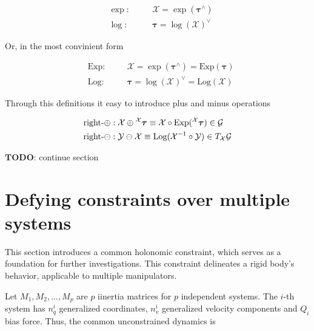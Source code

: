 \begin{equation}
    \begin{aligned}
        \label{eqn:exp_log_for_r_m}
        & \exp : \quad && \mathcal{X} = \exp(\boldsymbol{\tau}^\wedge) \\
        & \log : \quad && \boldsymbol{\tau} = \log(\mathcal{X})^\vee
    \end{aligned}
\end{equation}

Or, in the most convinient form

\begin{equation}
    \begin{aligned}
        \label{eqn:big_exp_log_for_r_m}
        & \text{Exp} : \quad && \mathcal{X} 
        = \exp(\boldsymbol{\tau}^\wedge) 
        = \text{Exp}(\boldsymbol{\tau})\\
        & \text{Log} : \quad && \boldsymbol{\tau} 
        = \log(\mathcal{X})^\vee
        = \text{Log}(\mathcal{X})
    \end{aligned}
\end{equation}

Through this definitions it easy to introduce plus and minus operations

\begin{equation}
    \begin{aligned}
        & \text{right-} \oplus: 
        \mathcal{X} \oplus \prescript{\mathcal{X}}{}{\boldsymbol{\tau}} 
        \equiv \mathcal{X} \circ 
        \text{Exp}(\prescript{\mathcal{X}}{}{\boldsymbol{\tau}}) \in \mathcal{G} \\
        & \text{right-} \ominus:
        \mathcal{Y} \ominus \mathcal{X} 
        \equiv \text{Log}(\mathcal{X}^{-1} \circ \mathcal{Y}) 
        \in T_{\mathcal{X}}\mathcal{G}
    \end{aligned}
\end{equation}

$\mathbf{TODO}$: continue section

\section{Defying constraints over multiple systems}

This section introduces a common holonomic constraint, which serves as a foundation 
for further investigations. This constraint delineates a rigid body's behavior, 
applicable to multiple manipulators.

Let $M_1, M_2, \dots, M_p$ are $p$ iinertia matrices for $p$ independent systems. 
The $i$-th system has $n_q^i$ generalized coordinates, $n_v^i$ generalized velocity 
components and $Q_i$ bias force. Thus, the common unconstrained dynamics is

